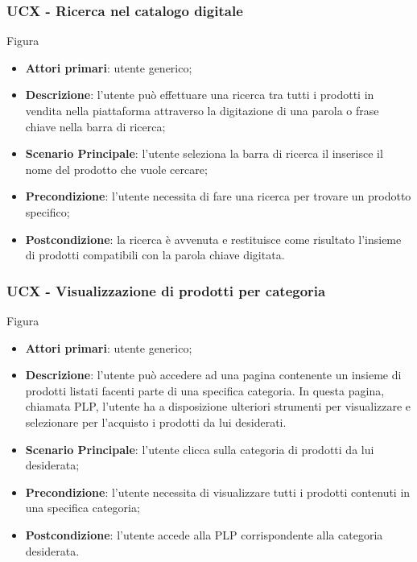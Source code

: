 \subsubsection{UCX - Ricerca nel catalogo digitale}
Figura \\
\begin{itemize}
\item \textbf{Attori primari}: utente generico;
\item \textbf{Descrizione}: l'utente può effettuare una ricerca tra tutti i prodotti in vendita nella piattaforma attraverso la digitazione di una parola o frase chiave nella barra di ricerca;
\item \textbf{Scenario Principale}: l'utente seleziona la barra di ricerca il inserisce il nome del prodotto che vuole cercare;
\item \textbf{Precondizione}: l'utente necessita di fare una ricerca per trovare un prodotto specifico;
\item \textbf{Postcondizione}: la ricerca è avvenuta e restituisce come risultato l'insieme di prodotti compatibili con la parola chiave digitata.
\end{itemize}
\subsubsection{UCX - Visualizzazione di prodotti per categoria}
Figura \\
\begin{itemize}
\item \textbf{Attori primari}: utente generico;
\item \textbf{Descrizione}: l'utente può accedere ad una pagina contenente un insieme di prodotti listati facenti parte di una specifica categoria. In questa pagina, chiamata PLP, l'utente ha a disposizione ulteriori strumenti per visualizzare e selezionare per l'acquisto i prodotti da lui desiderati.
\item \textbf{Scenario Principale}: l'utente clicca sulla categoria di prodotti da lui desiderata;
\item \textbf{Precondizione}: l'utente necessita di visualizzare tutti i prodotti contenuti in una specifica categoria;
\item \textbf{Postcondizione}: l'utente accede alla PLP corrispondente alla categoria desiderata.
\end{itemize}
